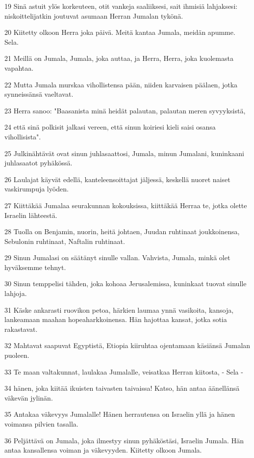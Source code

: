 \par 19 Sinä astuit ylös korkeuteen, otit vankeja saaliiksesi, sait ihmisiä lahjaksesi: niskoittelijatkin joutuvat asumaan Herran Jumalan tykönä.
\par 20 Kiitetty olkoon Herra joka päivä. Meitä kantaa Jumala, meidän apumme. Sela.
\par 21 Meillä on Jumala, Jumala, joka auttaa, ja Herra, Herra, joka kuolemasta vapahtaa.
\par 22 Mutta Jumala murskaa vihollistensa pään, niiden karvaisen päälaen, jotka synneissänsä vaeltavat.
\par 23 Herra sanoo: "Baasanista minä heidät palautan, palautan meren syvyyksistä,
\par 24 että sinä polkisit jalkasi vereen, että sinun koiriesi kieli saisi osansa vihollisista".
\par 25 Julkinähtävät ovat sinun juhlasaattosi, Jumala, minun Jumalani, kuninkaani juhlasaatot pyhäkössä.
\par 26 Laulajat käyvät edellä, kanteleensoittajat jäljessä, keskellä nuoret naiset vaskirumpuja lyöden.
\par 27 Kiittäkää Jumalaa seurakunnan kokouksissa, kiittäkää Herraa te, jotka olette Israelin lähteestä.
\par 28 Tuolla on Benjamin, nuorin, heitä johtaen, Juudan ruhtinaat joukkoinensa, Sebulonin ruhtinaat, Naftalin ruhtinaat.
\par 29 Sinun Jumalasi on säätänyt sinulle vallan. Vahvista, Jumala, minkä olet hyväksemme tehnyt.
\par 30 Sinun temppelisi tähden, joka kohoaa Jerusalemissa, kuninkaat tuovat sinulle lahjoja.
\par 31 Käske ankarasti ruovikon petoa, härkien laumaa ynnä vasikoita, kansoja, lankeamaan maahan hopeaharkkoinensa. Hän hajottaa kansat, jotka sotia rakastavat.
\par 32 Mahtavat saapuvat Egyptistä, Etiopia kiiruhtaa ojentamaan käsiänsä Jumalan puoleen.
\par 33 Te maan valtakunnat, laulakaa Jumalalle, veisatkaa Herran kiitosta, - Sela -
\par 34 hänen, joka kiitää ikuisten taivasten taivaissa! Katso, hän antaa äänellänsä väkevän jylinän.
\par 35 Antakaa väkevyys Jumalalle! Hänen herrautensa on Israelin yllä ja hänen voimansa pilvien tasalla.
\par 36 Peljättävä on Jumala, joka ilmestyy sinun pyhäköstäsi, Israelin Jumala. Hän antaa kansallensa voiman ja väkevyyden. Kiitetty olkoon Jumala.


